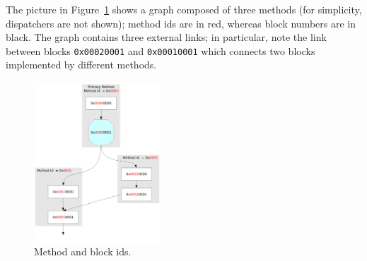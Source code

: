 The picture in Figure~\ref{block-id-fig} shows a graph composed of three methods (for
simplicity, dispatchers are not shown); method ids are in red, whereas
block numbers are in black. 
The graph contains three external links; in particular, note the link
between blocks \texttt{0x00020001} and \texttt{0x00010001} which
connects two blocks implemented by different methods.
\begin{figure}[h]
\begin{center}
\includegraphics[height=6cm]{blockid}
\caption{Method and block ids.}\label{block-id-fig}
\end{center}
\end{figure}

